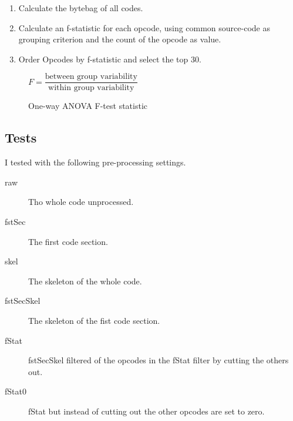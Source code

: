\documentclass[../main.tex]{subfiles}
\begin{document}
\begin{enumerate}
  \item Calculate the bytebag of all codes.
  \item Calculate an f-statistic for each opcode, using common source-code as grouping criterion and the count of the opcode as value.
  \item Order Opcodes by f-statistic and select the top 30.
\end{enumerate}

\begin{figure*}[ht!]
  \centering
  \begin{math}
    F = \dfrac{\textrm{between group variability}}{\textrm{within group variability}}
  \end{math}
  \caption{One-way ANOVA F-test statistic}
\end{figure*}

\subsection{Tests}
I tested with the following pre-processing settings.

\begin{description}
  \item[raw] Tho whole code unprocessed.
  \item[fstSec] The first code section.
  \item[skel] The skeleton of the whole code.
  \item[fstSecSkel] The skeleton of the fist code section.
  \item[fStat] fstSecSkel filtered of the opcodes in the fStat filter by cutting the others out.
  \item[fStat0] fStat but instead of cutting out the other opcodes are set to zero.
\end{description}
\end{document}
